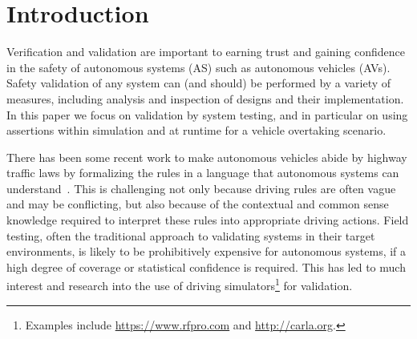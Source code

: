 \section{Introduction}

Verification and validation are important to earning trust and gaining confidence in the safety of autonomous systems (AS) such as autonomous vehicles (AVs). Safety validation of any system can (and should) be performed by a variety of measures, including analysis and inspection of designs and their implementation. In this paper we focus on validation by system testing, and in particular on using assertions within simulation and at runtime for a vehicle overtaking scenario. 
%

There has been some recent work to make autonomous vehicles abide by highway traffic laws by formalizing the rules in a language that autonomous systems can understand~\cite{?}. This is challenging not only because driving rules are often vague and may be conflicting, but also because of the contextual and common sense knowledge required to interpret these rules into appropriate driving actions. 
%
Field testing, often the traditional approach to validating systems in their target environments, is likely to be prohibitively expensive for autonomous systems, if a high degree of coverage or statistical confidence is required. This has led to much interest and research into the use of driving simulators\footnote{Examples include \url{https://www.rfpro.com} and \url{http://carla.org}.} for validation. 
%
%
